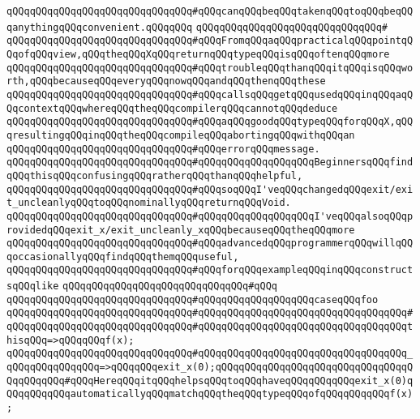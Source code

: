\verb|qQQqqQQqqQQqqQQqqQQqqQQqqQQqqQQq#qQQqcanqQQqbeqQQqtakenqQQqtoqQQqbeqQQqanythingqQQqconvenient.qQQqqQQq|\newline
\verb|qQQqqQQqqQQqqQQqqQQqqQQqqQQqqQQq#|\newline
\verb|qQQqqQQqqQQqqQQqqQQqqQQqqQQqqQQq#qQQqFromqQQqaqQQqpracticalqQQqpointqQQqofqQQqview,qQQqtheqQQqXqQQqreturnqQQqtypeqQQqisqQQqoftenqQQqmore|\newline
\verb|qQQqqQQqqQQqqQQqqQQqqQQqqQQqqQQq#qQQqtroubleqQQqthanqQQqitqQQqisqQQqworth,qQQqbecauseqQQqeveryqQQqnowqQQqandqQQqthenqQQqthese|\newline
\verb|qQQqqQQqqQQqqQQqqQQqqQQqqQQqqQQq#qQQqcallsqQQqgetqQQqusedqQQqinqQQqaqQQqcontextqQQqwhereqQQqtheqQQqcompilerqQQqcannotqQQqdeduce|\newline
\verb|qQQqqQQqqQQqqQQqqQQqqQQqqQQqqQQq#qQQqaqQQqgoodqQQqtypeqQQqforqQQqX,qQQqresultingqQQqinqQQqtheqQQqcompileqQQqabortingqQQqwithqQQqan|\newline
\verb|qQQqqQQqqQQqqQQqqQQqqQQqqQQqqQQq#qQQqerrorqQQqmessage.|\newline
\verb|qQQqqQQqqQQqqQQqqQQqqQQqqQQqqQQq#qQQqqQQqqQQqqQQqqQQqBeginnersqQQqfindqQQqthisqQQqconfusingqQQqratherqQQqthanqQQqhelpful,|\newline
\verb|qQQqqQQqqQQqqQQqqQQqqQQqqQQqqQQq#qQQqsoqQQqI'veqQQqchangedqQQqexit/exit_uncleanlyqQQqtoqQQqnominallyqQQqreturnqQQqVoid.|\newline
\verb|qQQqqQQqqQQqqQQqqQQqqQQqqQQqqQQq#qQQqqQQqqQQqqQQqqQQqI'veqQQqalsoqQQqprovidedqQQqexit_x/exit_uncleanly_xqQQqbecauseqQQqtheqQQqmore|\newline
\verb|qQQqqQQqqQQqqQQqqQQqqQQqqQQqqQQq#qQQqadvancedqQQqprogrammerqQQqwillqQQqoccasionallyqQQqfindqQQqthemqQQquseful,|\newline
\verb|qQQqqQQqqQQqqQQqqQQqqQQqqQQqqQQq#qQQqforqQQqexampleqQQqinqQQqconstructsqQQqlike|\newline
\verb|qQQqqQQqqQQqqQQqqQQqqQQqqQQqqQQq#qQQq|\newline
\verb|qQQqqQQqqQQqqQQqqQQqqQQqqQQqqQQq#qQQqqQQqqQQqqQQqqQQqcaseqQQqfoo|\newline
\verb|qQQqqQQqqQQqqQQqqQQqqQQqqQQqqQQq#qQQqqQQqqQQqqQQqqQQqqQQqqQQqqQQqqQQq#|\newline
\verb|qQQqqQQqqQQqqQQqqQQqqQQqqQQqqQQq#qQQqqQQqqQQqqQQqqQQqqQQqqQQqqQQqqQQqthisqQQq=>qQQqqQQqf(x);|\newline
\verb|qQQqqQQqqQQqqQQqqQQqqQQqqQQqqQQq#qQQqqQQqqQQqqQQqqQQqqQQqqQQqqQQqqQQq_qQQqqQQqqQQqqQQq=>qQQqqQQqexit_x(0);qQQqqQQqqQQqqQQqqQQqqQQqqQQqqQQqqQQqqQQqqQQq#qQQqHereqQQqitqQQqhelpsqQQqtoqQQqhaveqQQqqQQqqQQqexit_x(0)qQQqqQQqqQQqautomaticallyqQQqmatchqQQqtheqQQqtypeqQQqofqQQqqQQqqQQqf(x);|\newline
